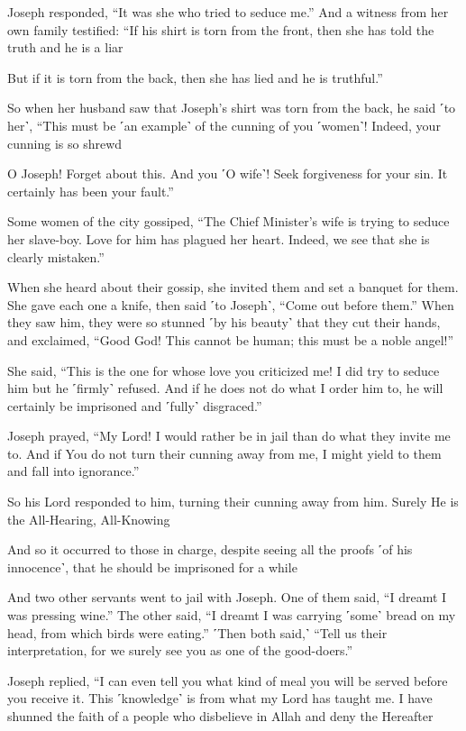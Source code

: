 Joseph responded, “It was she who tried to seduce me.” And a witness from her own family testified: “If his shirt is torn from the front, then she has told the truth and he is a liar

But if it is torn from the back, then she has lied and he is truthful.”

So when her husband saw that Joseph’s shirt was torn from the back, he said ˹to her˺, “This must be ˹an example˺ of the cunning of you ˹women˺! Indeed, your cunning is so shrewd

O Joseph! Forget about this. And you ˹O wife˺! Seek forgiveness for your sin. It certainly has been your fault.”

Some women of the city gossiped, “The Chief Minister’s wife is trying to seduce her slave-boy. Love for him has plagued her heart. Indeed, we see that she is clearly mistaken.”

When she heard about their gossip, she invited them and set a banquet for them. She gave each one a knife, then said ˹to Joseph˺, “Come out before them.” When they saw him, they were so stunned ˹by his beauty˺ that they cut their hands, and exclaimed, “Good God! This cannot be human; this must be a noble angel!”

She said, “This is the one for whose love you criticized me! I did try to seduce him but he ˹firmly˺ refused. And if he does not do what I order him to, he will certainly be imprisoned and ˹fully˺ disgraced.”

Joseph prayed, “My Lord! I would rather be in jail than do what they invite me to. And if You do not turn their cunning away from me, I might yield to them and fall into ignorance.”

So his Lord responded to him, turning their cunning away from him. Surely He is the All-Hearing, All-Knowing

And so it occurred to those in charge, despite seeing all the proofs ˹of his innocence˺, that he should be imprisoned for a while

And two other servants went to jail with Joseph. One of them said, “I dreamt I was pressing wine.” The other said, “I dreamt I was carrying ˹some˺ bread on my head, from which birds were eating.” ˹Then both said,˺ “Tell us their interpretation, for we surely see you as one of the good-doers.”

Joseph replied, “I can even tell you what kind of meal you will be served before you receive it. This ˹knowledge˺ is from what my Lord has taught me. I have shunned the faith of a people who disbelieve in Allah and deny the Hereafter

